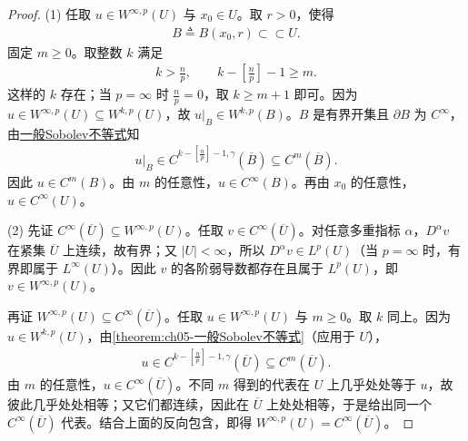 \documentclass[../../main.tex]{subfiles}
\begin{document}
\begin{proof}

(1) 任取 $u\in W^{\infty,p}(U)$ 与 $x_0\in U$。取 $r>0$，使得
\begin{align*}
B\triangleq B(x_0,r)\subset\subset U.
\end{align*}
固定 $m\geqslant0$。取整数 $k$ 满足
\begin{align*}
k>\frac np,\qquad k-\left[\frac np\right]-1\geqslant m.
\end{align*}
这样的 $k$ 存在；当 $p=\infty$ 时 $\frac np=0$，取 $k\geqslant m+1$ 即可。因为 $u\in W^{\infty,p}(U)\subseteq W^{k,p}(U)$，故 $u|_B\in W^{k,p}(B)$。$B$ 是有界开集且 $\partial B$ 为 $C^\infty$，由\hyperref[theorem:ch05-一般Sobolev不等式]{一般Sobolev不等式}知
\begin{align*}
u|_B\in C^{k-\left[\frac np\right]-1,\gamma}(\overline B)\subseteq C^m(\overline B).
\end{align*}
因此 $u\in C^m(B)$。由 $m$ 的任意性，$u\in C^\infty(B)$。再由 $x_0$ 的任意性，$u\in C^\infty(U)$。

(2) 先证 $C^\infty(\overline U)\subseteq W^{\infty,p}(U)$。任取 $v\in C^\infty(\overline U)$。对任意多重指标 $\alpha$，$D^\alpha v$ 在紧集 $\overline U$ 上连续，故有界；又 $|U|<\infty$，所以 $D^\alpha v\in L^p(U)$（当 $p=\infty$ 时，有界即属于 $L^\infty(U)$）。因此 $v$ 的各阶弱导数都存在且属于 $L^p(U)$，即 $v\in W^{\infty,p}(U)$。

再证 $W^{\infty,p}(U)\subseteq C^\infty(\overline U)$。任取 $u\in W^{\infty,p}(U)$ 与 $m\geqslant0$。取 $k$ 同上。因为 $u\in W^{k,p}(U)$，由\cref{theorem:ch05-一般Sobolev不等式}（应用于 $U$），
\begin{align*}
u\in C^{k-\left[\frac np\right]-1,\gamma}(\overline U)\subseteq C^m(\overline U).
\end{align*}
由 $m$ 的任意性，$u\in C^\infty(\overline U)$。不同 $m$ 得到的代表在 $U$ 上几乎处处等于 $u$，故彼此几乎处处相等；又它们都连续，因此在 $\overline U$ 上处处相等，于是给出同一个 $C^\infty(\overline U)$ 代表。结合上面的反向包含，即得 $W^{\infty,p}(U)=C^\infty(\overline U)$。
\end{proof}
\end{document}
